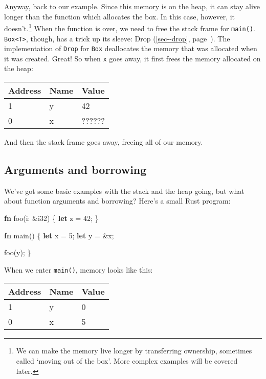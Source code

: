 \documentclass[a4paper,]{book}
\renewcommand*{\hyperref}[2][\ar]{%
  \def\ar{#2}%
  #2 (\autoref{#1}, page~\pageref{#1})}
\newenvironment{Shaded}{\begin{snugshade}}{\end{snugshade}}
\newcommand{\KeywordTok}[1]{\textcolor[rgb]{0.13,0.29,0.53}{\textbf{{#1}}}}
\newcommand{\DataTypeTok}[1]{\textcolor[rgb]{0.13,0.29,0.53}{{#1}}}
\newcommand{\DecValTok}[1]{\textcolor[rgb]{0.00,0.00,0.81}{{#1}}}
\newcommand{\NormalTok}[1]{{#1}}
\begin{document}
Anyway, back to our example. Since this memory is on the heap, it can
stay alive longer than the function which allocates the box. In this
case, however, it doesn't.\footnote{We can make the memory live longer
  by transferring ownership, sometimes called `moving out of the box'.
  More complex examples will be covered later.} When the function is
over, we need to free the stack frame for \texttt{main()}.
\texttt{Box\textless{}T\textgreater{}}, though, has a trick up its
sleeve: \hyperref[sec--drop]{Drop}. The implementation of \texttt{Drop}
for \texttt{Box} deallocates the memory that was allocated when it was
created. Great! So when \texttt{x} goes away, it first frees the memory
allocated on the heap:

\begin{longtable}[c]{@{}lll@{}}
\toprule
Address & Name & Value\tabularnewline
\midrule
\endhead
1 & y & 42\tabularnewline
0 & x & ??????\tabularnewline
\bottomrule
\end{longtable}

And then the stack frame goes away, freeing all of our memory.

\subsection{Arguments and borrowing}\label{arguments-and-borrowing}

We've got some basic examples with the stack and the heap going, but
what about function arguments and borrowing? Here's a small Rust
program:

\begin{Shaded}
\begin{Highlighting}[]
\KeywordTok{fn} \NormalTok{foo(i: &}\DataTypeTok{i32}\NormalTok{) \{}
    \KeywordTok{let} \NormalTok{z = }\DecValTok{42}\NormalTok{;}
\NormalTok{\}}

\KeywordTok{fn} \NormalTok{main() \{}
    \KeywordTok{let} \NormalTok{x = }\DecValTok{5}\NormalTok{;}
    \KeywordTok{let} \NormalTok{y = &x;}

    \NormalTok{foo(y);}
\NormalTok{\}}
\end{Highlighting}
\end{Shaded}

When we enter \texttt{main()}, memory looks like this:

\begin{longtable}[c]{@{}lll@{}}
\toprule
Address & Name & Value\tabularnewline
\midrule
\endhead
1 & y & 0\tabularnewline
0 & x & 5\tabularnewline
\bottomrule
\end{longtable}
\end{document}
